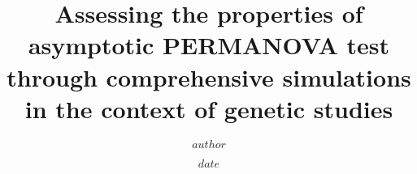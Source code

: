 \documentclass[IB,BIB]{TFUOC}%
\title{Assessing the properties of asymptotic \break PERMANOVA test through comprehensive \break simulations in the context of genetic studies} %
\author{$author$} %
\date{$date$}
\begin{document}
\estructura\label{fitxa}


\newpage

\tableofcontents



% 
% 
% 
% 
% 
% 
% 
\end{document}
